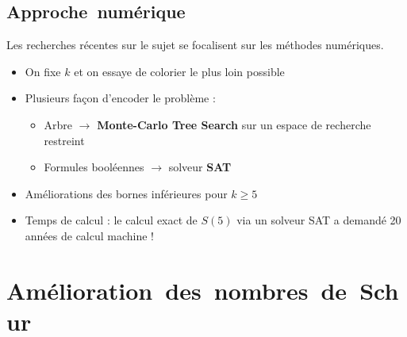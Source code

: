 \documentclass[graphics]{beamer}
\begin{document}
\subsection{Approche~numérique}

\begin{frame}
	Les recherches récentes sur le sujet se focalisent sur les méthodes numériques.
	\begin{itemize}
		\item On fixe \(k\) et on essaye de colorier le plus loin possible
		\item Plusieurs façon d'encoder le problème :
		\begin{itemize}
		\item Arbre \(\rightarrow\) \textbf{Monte-Carlo Tree Search} sur un espace de recherche restreint
		\item Formules booléennes \(\rightarrow\) solveur \textbf{SAT} 
		\end{itemize}
		\pause
		\item Améliorations des bornes inférieures pour \(k \geq 5\) 
		\item Temps de calcul : le calcul exact de \(S(5)\) via un solveur SAT a demandé 20 années de calcul machine !
	\end{itemize}
	
\end{frame}

\section{Amélioration~des~nombres~de~Schur}
\end{document}
